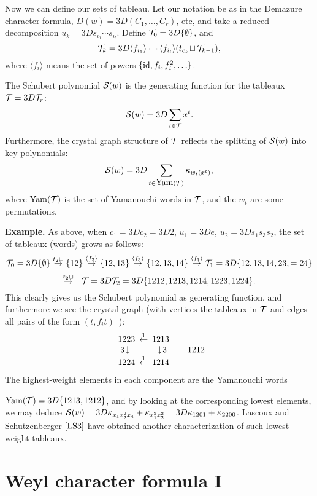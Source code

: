 Now we can define our sets of tableau.
Let our notation be as in the Demazure
character formula,
$D(w) =3D (C_1,\ldots, C_r)$, etc,
and take a reduced decomposition
$u_k =3D s_{i_1} \cdots s_{i_l}$.  Define
${\cal T}_0 =3D \{ \emptyset \}$, and
$$
{\cal T}_{k} =3D \langle f_{i_1} \rangle \cdots
\langle f_{i_l} \rangle( t_{c_k} \!\sqcup {\cal T}_{k-1} ),
$$
where $\langle f_{i} \rangle$ means the set of powers
$\{\mathop{\rm id}, f_i, f_i^2, \ldots\} $.

\begin{thm}  The Schubert polynomial ${\cal S}(w)$
is the generating function
for the tableaux ${\cal T} =3D {\cal T}_r$:
$$
{\cal S}(w) =3D \sum_{t \in {\cal T}} x^t.
$$
Furthermore, the crystal graph structure of
${\cal T}$ reflects the splitting of ${\cal S}(w)$ into key polynomials:
$$
{\cal S}(w) =3D \sum_{t \in \mbox{Yam}({\cal T})} \kappa_{w_t(x^t)},
$$
where $\mbox{Yam}({\cal T})$ is the set of Yamanouchi words in
${\cal T}$, and the $w_t$ are some permutations.
\end{thm}
{\bf Example.}
As above, when $c_1 =3D c_2 =3D 2$, $u_1 =3D e$, $u_2 =3D s_1 s_3 s_2$,
the set of tableaux (words) grows as follows:
$$
{\cal T}_0 =3D \{\emptyset\}
\stackrel{t_2 \sqcup}{\rightarrow} \{ 12 \}
\stackrel{\langle f_2 \rangle}{\rightarrow} \{12, 13\}
\stackrel{\langle f_3 \rangle}{\rightarrow}  \{12, 13, 14\}
\stackrel{\langle f_1 \rangle}{\rightarrow} {\cal T}_1 =3D \{12, 13, 14, 23, =
24\}
$$
$$
\stackrel{t_2 \sqcup}{\rightarrow}
\ \ {\cal T} =3D {\cal T}_2 =3D \{1212, 1213, 1214, 1223, 1224\}.
$$
This clearly gives us the Schubert polynomial
as generating function,
and furthermore we see the crystal graph
(with vertices the tableaux in ${\cal T}$ and edges all pairs of the
form $(t, f_i t)$\ ):
$$
\begin{array}{ccc}
1223 \!\! & \! \stackrel{1}{\leftarrow}  \! & \!\! 1213 \\
\mbox{\small 3}\! \downarrow & & \downarrow\! \mbox{\small 3} \\
1224 \!\!& \! \stackrel{1}{\leftarrow} \! &\!\! 1214
\end{array}
\ \ \  \ \ 1212
$$
The highest-weight elements in each component are the
Yamanouchi words

$\mbox{Yam}({\cal T}) =3D \{1213, 1212\}$, and by looking at
the corresponding lowest elements, we may deduce
${\cal S}(w) =3D \kappa_{x_1 x_2^2 x_4} + \kappa_{x_1^2 x_2^2} =3D
\kappa_{1201} + \kappa_{2200}$.
Lascoux and Schutzenberger $\cite{LS3}$
have obtained another characterization of such lowest-weight
tableaux.


\section{Weyl character formula I}

